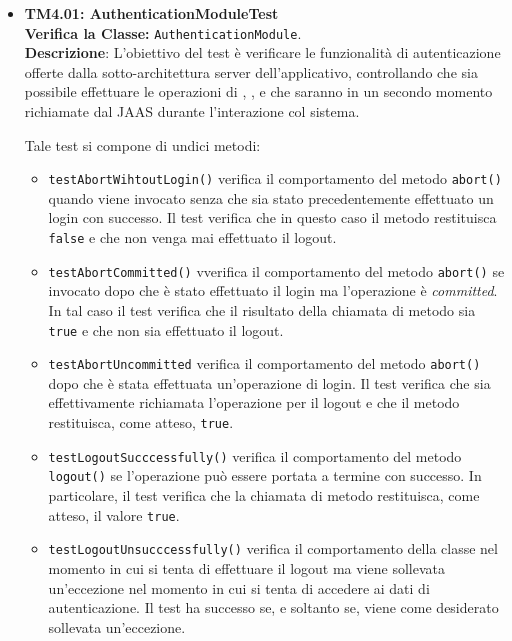 \begin{itemize}

\item \textbf{TM4.01: AuthenticationModuleTest}\\
\textbf{Verifica la Classe:} \texttt{AuthenticationModule}.\\
\textbf{Descrizione}: L'obiettivo del test è verificare le funzionalità di autenticazione offerte dalla sotto-architettura server dell'applicativo, controllando che sia possibile effettuare le operazioni di , ,  e  che saranno in un secondo momento richiamate dal  JAAS durante l'interazione col sistema.

Tale test si compone di undici metodi:
\begin{itemize}
\item \texttt{testAbortWihtoutLogin()} verifica il comportamento del metodo \texttt{abort()} quando viene invocato senza che sia stato precedentemente effettuato un login con successo. Il test verifica che in questo caso il metodo restituisca \texttt{false} e che non venga mai effettuato il logout.

\item \texttt{testAbortCommitted()} vverifica il comportamento del metodo \texttt{abort()} se invocato dopo che è stato effettuato il login ma l'operazione è \textit{committed}. In tal caso il test verifica che il risultato della chiamata di metodo sia \texttt{true} e che non sia effettuato il logout.

\item \texttt{testAbortUncommitted} verifica il comportamento del metodo \texttt{abort()} dopo che è stata effettuata un'operazione di login. Il test verifica che sia effettivamente richiamata l'operazione per il logout e che il metodo restituisca, come atteso, \texttt{true}.

\item \texttt{testLogoutSucccessfully()} verifica il comportamento del metodo \texttt{logout()} se l'operazione può essere portata a termine con successo. In particolare, il test verifica che la chiamata di metodo restituisca, come atteso, il valore \texttt{true}.

\item \texttt{testLogoutUnsucccessfully()} verifica il comportamento della classe nel momento in cui si tenta di effettuare il logout ma viene sollevata un'eccezione nel momento in cui si tenta di accedere ai dati di autenticazione. Il test ha successo se, e soltanto se, viene come desiderato sollevata un'eccezione.


\end{itemize}
\end{itemize}
